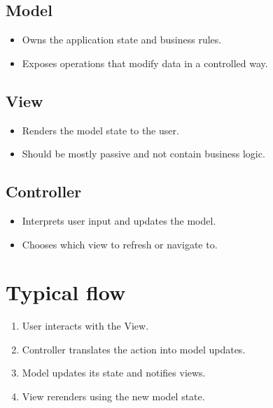 \documentclass[letterpaper,10pt,english]{sphinxmanual}
\begin{document}
\subsection{Model}
\label{\detokenize{appendix_b_mvc_architecture:model}}\begin{itemize}
\item {} 
\sphinxAtStartPar
Owns the application state and business rules.

\item {} 
\sphinxAtStartPar
Exposes operations that modify data in a controlled way.

\end{itemize}


\subsection{View}
\label{\detokenize{appendix_b_mvc_architecture:view}}\begin{itemize}
\item {} 
\sphinxAtStartPar
Renders the model state to the user.

\item {} 
\sphinxAtStartPar
Should be mostly passive and not contain business logic.

\end{itemize}


\subsection{Controller}
\label{\detokenize{appendix_b_mvc_architecture:controller}}\begin{itemize}
\item {} 
\sphinxAtStartPar
Interprets user input and updates the model.

\item {} 
\sphinxAtStartPar
Chooses which view to refresh or navigate to.

\end{itemize}


\section{Typical flow}
\label{\detokenize{appendix_b_mvc_architecture:typical-flow}}\begin{enumerate}
%
\item {} 
\sphinxAtStartPar
User interacts with the View.

\item {} 
\sphinxAtStartPar
Controller translates the action into model updates.

\item {} 
\sphinxAtStartPar
Model updates its state and notifies views.

\item {} 
\sphinxAtStartPar
View re\sphinxhyphen{}renders using the new model state.

\end{enumerate}
\end{document}
